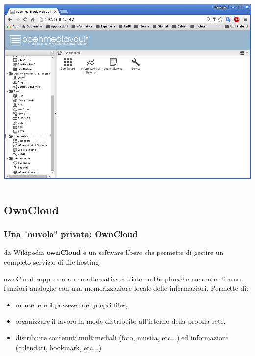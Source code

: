 \documentclass[11pt,xcolor=table]{beamer}
\begin{document}
\begin{frame}
\begin{columns}
\begin{column}{0.48\textwidth}
			\vspace{1mm}
			\includegraphics[width=\textwidth]{OMV/OMV9.png}
		\end{column}
	\end{columns}
\end{frame}

\subsection{OwnCloud}

\begin{frame}
	\frametitle{Una "nuvola" privata: OwnCloud}
	\begin{block}{da Wikipedia}
		\textbf{ownCloud} è un software libero che permette di gestire un completo servizio di file hosting.
	\end{block}
	\vspace{2mm}
	ownCloud rappresenta una alternativa al sistema Dropbox\textregistered che consente di avere funzioni analoghe con una memorizzazione locale delle informazioni. Permette di:
	\begin{itemize}
		\item mantenere il possesso dei propri files,
		\item organizzare il lavoro in modo distribuito all'interno della propria rete,
		\item distribuire contenuti multimediali (foto, musica, etc...) ed informazioni (calendari, bookmark, etc...)
	\end{itemize}

\end{frame}
\end{document}
